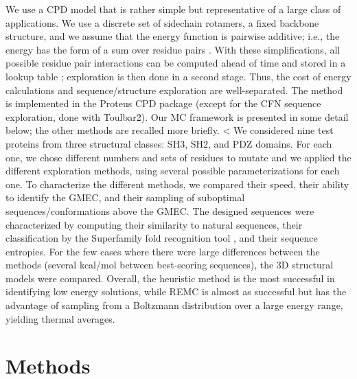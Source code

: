 \documentclass[a4paper,12pt]{article}
\begin{document}
We use a CPD model that is rather simple but representative of a large class of applications. We use a discrete
set of sidechain rotamers, a fixed backbone structure, and we assume that the energy function is pairwise additive;
i.e., the energy has the form of a sum over residue pairs \cite{Schmidt08b,Schmidt08,Simonson13b}. With these
simplifications, all possible residue pair interactions can be computed ahead of time and stored in a lookup table
\cite{Dahiyat97}; exploration is then done in a second stage. Thus, the cost of energy calculations and
sequence/structure exploration are well-separated. The method is implemented in the Proteus CPD package
\cite{Schmidt08,Simonson13b} (except for the CFN sequence exploration, done with Toulbar2). Our MC framework is
presented in some detail below; the other methods are recalled more briefly.
<
We considered nine test proteins from three structural classes: SH3, SH2, and PDZ domains. For each one, we chose
different numbers and sets of residues to mutate and we applied the different exploration methods, using several
possible parameterizations for each one. To characterize the different methods, we compared their speed, their
ability to identify the GMEC, and their sampling of suboptimal sequences/conformations above the GMEC. The
designed sequences were characterized by computing their similarity to natural sequences, their classification
by the Superfamily fold recognition tool \cite{Gough01,Wilson07}, and their sequence entropies. For the few cases
where there were large differences between the methods (several kcal/mol between best-scoring sequences), the 3D
structural models were compared. Overall, the heuristic method is the most successful in identifying low energy
solutions, while REMC is almost as successful but has the advantage of sampling from a Boltzmann distribution over
a large energy range, yielding thermal averages.

\section{Methods}
\end{document}
